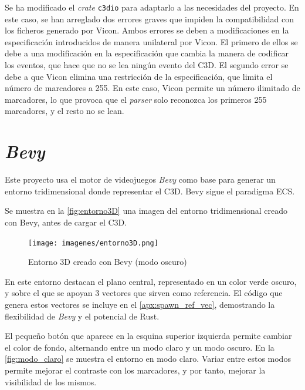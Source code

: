 Se ha modificado el \textit{crate} \texttt{c3dio} para adaptarlo a las necesidades del proyecto. En este caso, se han arreglado dos errores graves que impiden la compatibilidad con los ficheros generado por Vicon. Ambos errores se deben a modificaciones en la especificación introducidos de manera unilateral por Vicon. El primero de ellos se debe a una modificación en la especificación que cambia la manera de codificar los eventos, que hace que no se lea ningún evento del \ac{C3D}. El segundo error se debe a que Vicon elimina una restricción de la especificación, que limita el número de marcadores a 255. En este caso, Vicon permite un número ilimitado de marcadores, lo que provoca que el \textit{parser} solo reconozca los primeros 255 marcadores, y el resto no se lean.   

\section{\textit{Bevy}} \label{sec:bevy}
Este proyecto usa el motor de videojuegos \textit{Bevy} como base para generar un entorno tridimensional donde representar el \ac{C3D}. Bevy sigue el paradigma \ac{ECS}. 

Se muestra en la \autoref{fig:entorno3D} una imagen del entorno tridimensional creado con Bevy, antes de cargar el \ac{C3D}.


\begin{figure}[H]
  \centering
  \texttt{[image: imagenes/entorno3D.png]}
  \caption{Entorno 3D creado con Bevy (modo oscuro)}
  \label{fig:entorno3D}
\end{figure}

En este entorno destacan el plano central, representado en un color verde oscuro, y sobre el que se apoyan 3 vectores que sirven como referencia. El código que genera estos vectores se incluye en el \autoref{apx:spawn_ref_vec}, demostrando la flexibilidad de \textit{Bevy} y el potencial de Rust. 

El pequeño botón que aparece en la esquina superior izquierda permite cambiar el color de fondo, alternando entre un modo claro y un modo oscuro. En la \autoref{fig:modo_claro} se muestra el entorno en modo claro. Variar entre estos modos permite mejorar el contraste con los marcadores, y por tanto, mejorar la visibilidad de los mismos.

